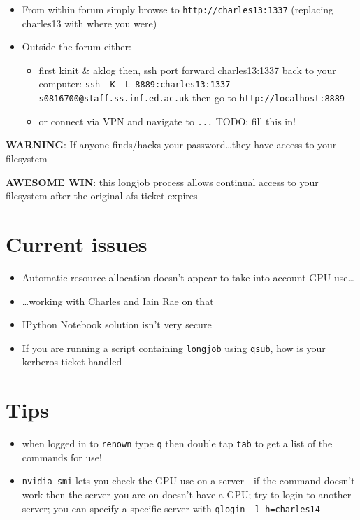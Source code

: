 \documentclass[]{article}
\begin{document}
\begin{enumerate}
  \begin{itemize}
  \itemsep1pt\parskip0pt
  \item
    From within forum simply browse to \texttt{http://charles13:1337}
    (replacing charles13 with where you were)
  \item
    Outside the forum either:

    \begin{itemize}
    \itemsep1pt\parskip0pt
    \item
      first kinit \& aklog then, ssh port forward charles13:1337 back to
      your computer:
      \texttt{ssh -K -L 8889:charles13:1337 s0816700@staff.ss.inf.ed.ac.uk}
      then go to \texttt{http://localhost:8889}
    \item
      or connect via VPN and navigate to \texttt{...} TODO: fill this
      in!
    \end{itemize}
  \end{itemize}
\end{enumerate}

{\textbf{WARNING}}: If anyone finds/hacks your password\ldots{}they have
access to your filesystem

\textbf{AWESOME WIN}: this longjob process allows continual access to
your filesystem after the original afs ticket expires

\section{Current issues}\label{current-issues}

\begin{itemize}
\itemsep1pt\parskip0pt
\item
  Automatic resource allocation doesn't appear to take into account GPU
  use\ldots{}
\item
  \ldots{}working with Charles and Iain Rae on that
\item
  IPython Notebook solution isn't very secure
\item
  If you are running a script containing \texttt{longjob} using
  \texttt{qsub}, how is your kerberos ticket handled
\end{itemize}

\section{Tips}\label{tips}

\begin{itemize}
\itemsep1pt\parskip0pt
\item
  when logged in to \texttt{renown} type \texttt{q} then double tap
  \texttt{tab} to get a list of the commands for use!
\item
  \texttt{nvidia-smi} lets you check the GPU use on a server - if the
  command doesn't work then the server you are on doesn't have a GPU;
  try to login to another server; you can specify a specific server with
  \texttt{qlogin -l h=charles14}
\end{itemize}
\end{document}
